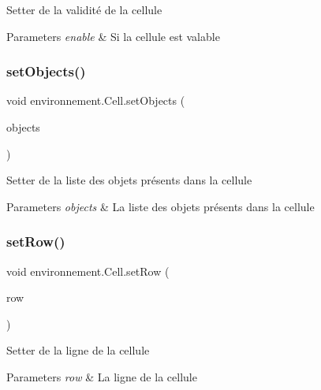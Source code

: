 Setter de la validité de la cellule 
\begin{DoxyParams}{Parameters}
{\em enable} & Si la cellule est valable \\
\hline
\end{DoxyParams}
\hypertarget{classenvironnement_1_1_cell_a7a5be16d3f2bd085a86e67d2266680eb}{}\label{classenvironnement_1_1_cell_a7a5be16d3f2bd085a86e67d2266680eb} 
\subsubsection{\texorpdfstring{set\+Objects()}{setObjects()}}
{\footnotesize\ttfamily void environnement.\+Cell.\+set\+Objects (\begin{DoxyParamCaption}\item[{Array\+List$<$ \hyperlink{classenvironnement_1_1_object}{Object} $>$}]{objects }\end{DoxyParamCaption})}

Setter de la liste des objets présents dans la cellule 
\begin{DoxyParams}{Parameters}
{\em objects} & La liste des objets présents dans la cellule \\
\hline
\end{DoxyParams}
\hypertarget{classenvironnement_1_1_cell_a66a02095836f9791548e7ef0547569b5}{}\label{classenvironnement_1_1_cell_a66a02095836f9791548e7ef0547569b5} 
\subsubsection{\texorpdfstring{set\+Row()}{setRow()}}
{\footnotesize\ttfamily void environnement.\+Cell.\+set\+Row (\begin{DoxyParamCaption}\item[{int}]{row }\end{DoxyParamCaption})}

Setter de la ligne de la cellule 
\begin{DoxyParams}{Parameters}
{\em row} & La ligne de la cellule \\
\hline
\end{DoxyParams}
\hypertarget{classenvironnement_1_1_cell_ab3f7830b0b36a34150a732d2f17ba66d}{}\label{classenvironnement_1_1_cell_ab3f7830b0b36a34150a732d2f17ba66d} 
